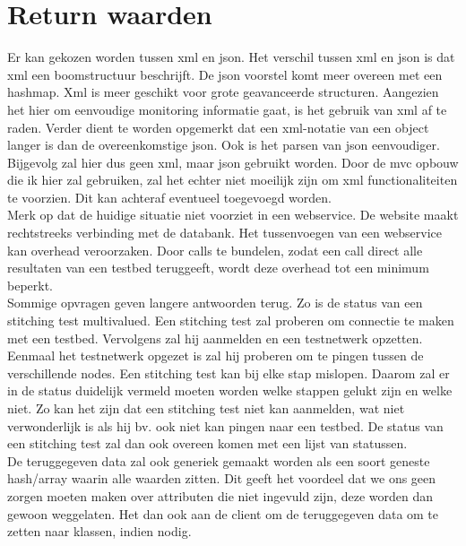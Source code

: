 \documentclass[11pt]{article}
\begin{document}
\section{Return waarden}
Er kan gekozen worden tussen xml en json. Het verschil tussen xml en json is dat xml een boomstructuur beschrijft. De json voorstel komt meer overeen met een hashmap. Xml is meer geschikt voor grote geavanceerde structuren. Aangezien het hier om eenvoudige monitoring informatie gaat, is het gebruik van xml af te raden. Verder dient te worden opgemerkt dat een xml-notatie van een object langer is dan de overeenkomstige json. Ook is het parsen van json eenvoudiger. Bijgevolg zal hier dus geen xml, maar json gebruikt worden. Door de mvc opbouw die ik hier zal gebruiken, zal het echter niet moeilijk zijn om xml functionaliteiten te voorzien. Dit kan achteraf eventueel toegevoegd worden.\\

Merk op dat de huidige situatie niet voorziet in een webservice. De website maakt rechtstreeks verbinding met de databank. Het tussenvoegen van een webservice kan overhead veroorzaken. Door calls te bundelen, zodat een call direct alle resultaten van een testbed teruggeeft, wordt deze overhead tot een minimum beperkt.\\

Sommige opvragen geven langere antwoorden terug. Zo is de status van een stitching test multivalued. Een stitching test zal proberen om connectie te maken met een testbed. Vervolgens zal hij aanmelden en een testnetwerk opzetten. Eenmaal het testnetwerk opgezet is zal hij proberen om te pingen tussen de verschillende nodes. Een stitching test kan bij elke stap mislopen. Daarom zal er in de status duidelijk vermeld moeten worden welke stappen gelukt zijn en welke niet. Zo kan het zijn dat een stitching test niet kan aanmelden, wat niet verwonderlijk is als hij bv. ook niet kan pingen naar een testbed. De status van een stitching test zal dan ook overeen komen met een lijst van statussen.\\

De teruggegeven data zal ook generiek gemaakt worden als een soort geneste hash/array waarin alle waarden zitten. Dit geeft het voordeel dat we ons geen zorgen moeten maken over attributen die niet ingevuld zijn, deze worden dan gewoon weggelaten. Het dan ook aan de client om de teruggegeven data om te zetten naar klassen, indien nodig.
\end{document}
